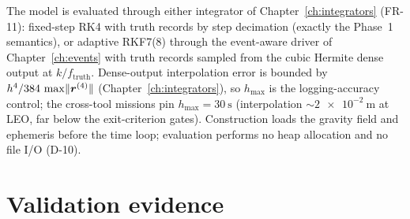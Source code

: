 The model is evaluated through either integrator of
Chapter~\ref{ch:integrators} (FR-11): fixed-step RK4 with truth records
by step decimation (exactly the Phase~1 semantics), or adaptive RKF7(8)
through the event-aware driver of Chapter~\ref{ch:events} with truth
records sampled from the cubic Hermite dense output at
$k/f_{\mathrm{truth}}$. Dense-output interpolation error is bounded by
$h^{4}/384\,\max\lVert\bm{r}^{(4)}\rVert$ (Chapter~\ref{ch:integrators}),
so $h_{\max}$ is the logging-accuracy control; the cross-tool missions
pin $h_{\max} = \qty{30}{\second}$ (interpolation
$\sim\qty{2e-2}{\metre}$ at LEO, far below the exit-criterion gates).
Construction loads the gravity field and ephemeris before the time loop;
evaluation performs no heap allocation and no file I/O (D-10).

\section{Validation evidence}
\label{sec:env:validation}

